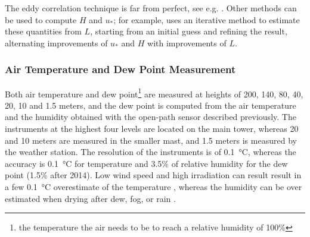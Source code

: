 \documentclass[a4paper]{book}
\begin{document}
The eddy correlation technique is far from perfect, see e.g. \citep{microhandbook, ed_co2}. Other methods can be used to compute $H$ and $u_*$; for example, \cite{cabauw_abl} uses an iterative method to estimate these quantities from $L$, starting from an initial guess and refining the result, alternating improvements of $u_*$ and $H$ with improvements of $L$.

\subsubsection{Air Temperature and Dew Point Measurement}
Both air temperature and dew point\footnote{the temperature the air needs to be to reach a relative humidity of 100\%} are measured at heights of 200, 140, 80, 40, 20, 10 and 1.5 meters, and the dew point is computed from the air temperature and the humidity obtained with the open-path sensor described previously. The instruments at the highest four levels are located on the main tower, whereas 20 and 10 meters are measured in the smaller mast, and 1.5 meters is measured by the weather station. The resolution of the instruments is of \SI{0.1}{\celsius}, whereas the accuracy is \SI{0.1}{\celsius} for temperature and 3.5\% of relative humidity for the dew point (1.5\% after 2014). Low wind speed and high irradiation can result result in a few \SI{0.1}{\celsius} overestimate of the temperature \citep{tempoverestimate}, whereas the humidity can be over estimated when drying after dew, fog, or rain \citep{cabauwinsitu}.
\end{document}

